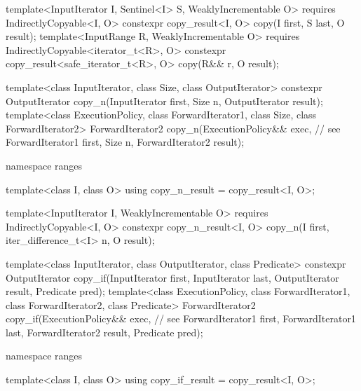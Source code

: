 \begin{addedblock}
\begin{codeblock}
{    template<InputIterator I, Sentinel<I> S, WeaklyIncrementable O>
      requires IndirectlyCopyable<I, O>
      constexpr copy_result<I, O>
        copy(I first, S last, O result);
    template<InputRange R, WeaklyIncrementable O>
      requires IndirectlyCopyable<iterator_t<R>, O>
      constexpr copy_result<safe_iterator_t<R>, O>
        copy(R&& r, O result);
  }
\end{codeblock}\end{addedblock}\begin{codeblock}
  template<class InputIterator, class Size, class OutputIterator>
    constexpr OutputIterator copy_n(InputIterator first, Size n,
                                    OutputIterator result);
  template<class ExecutionPolicy, class ForwardIterator1, class Size,
           class ForwardIterator2>
    ForwardIterator2 copy_n(ExecutionPolicy&& exec, // see 
                            ForwardIterator1 first, Size n,
                            ForwardIterator2 result);
\end{codeblock}\begin{addedblock}\begin{codeblock}
  namespace ranges {
    template<class I, class O>
    using copy_n_result = copy_result<I, O>;

    template<InputIterator I, WeaklyIncrementable O>
      requires IndirectlyCopyable<I, O>
      constexpr copy_n_result<I, O>
        copy_n(I first, iter_difference_t<I> n, O result);
  }
\end{codeblock}\end{addedblock}\begin{codeblock}
  template<class InputIterator, class OutputIterator, class Predicate>
    constexpr OutputIterator copy_if(InputIterator first, InputIterator last,
                                     OutputIterator result, Predicate pred);
  template<class ExecutionPolicy, class ForwardIterator1, class ForwardIterator2,
           class Predicate>
    ForwardIterator2 copy_if(ExecutionPolicy&& exec, // see 
                             ForwardIterator1 first, ForwardIterator1 last,
                             ForwardIterator2 result, Predicate pred);
\end{codeblock}\begin{addedblock}\begin{codeblock}
  namespace ranges {
    template<class I, class O>
    using copy_if_result = copy_result<I, O>;

}
\end{codeblock}
\end{addedblock}
